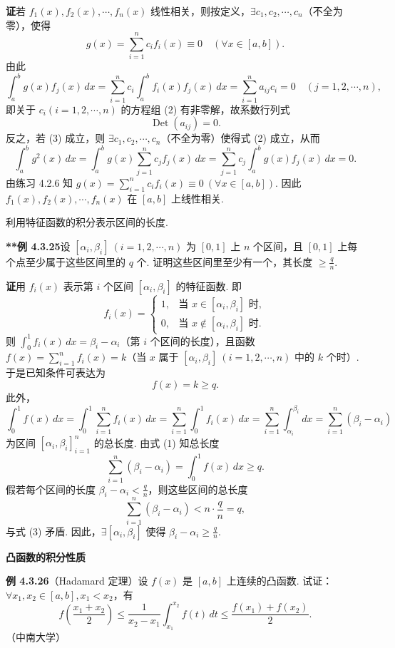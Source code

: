\documentclass[UTF8, 12pt, fontset=fandol, oneside]{ctexart}
\begin{document}
\noindent\textbf{证}\quad 若 $f_1(x),f_2(x),\cdots,f_n(x)$ 线性相关，则按定义，$\exists c_1,c_2,\cdots,c_n$（不全为零），使得
\[
g(x)=\sum_{i=1}^n c_i f_i(x)\equiv0\quad(\forall x\in[a,b]).
\tag{1}
\]
由此
\[
\int_a^b g(x)f_j(x)\,dx
=\sum_{i=1}^n c_i\int_a^b f_i(x)f_j(x)\,dx
=\sum_{i=1}^n a_{ij}c_i=0\quad(j=1,2,\cdots,n),
\tag{2}
\]
即关于 $c_i(i=1,2,\cdots,n)$ 的方程组 (2) 有非零解，故系数行列式
\[
\operatorname{Det}(a_{ij})=0.
\tag{3}
\]
反之，若 (3) 成立，则 $\exists c_1,c_2,\cdots,c_n$（不全为零）使得式 (2) 成立，从而
\[
\int_a^b g^2(x)\,dx
=\int_a^b g(x)\sum_{j=1}^n c_j f_j(x)\,dx
=\sum_{j=1}^n c_j\int_a^b g(x)f_j(x)\,dx=0.
\]
由练习 4.2.6 知 $g(x)=\sum_{i=1}^n c_i f_i(x)\equiv0\ (\forall x\in[a,b])$. 因此 $f_1(x),f_2(x),\cdots,f_n(x)$ 在 $[a,b]$ 上线性相关.

\noindent 利用特征函数的积分表示区间的长度.

\noindent\textbf{**例 4.3.25}\quad 设 $[\alpha_i,\beta_i]\ (i=1,2,\cdots,n)$ 为 $[0,1]$ 上 $n$ 个区间，且 $[0,1]$ 上每个点至少属于这些区间里的 $q$ 个. 证明这些区间里至少有一个，其长度 $\ge\frac{q}{n}$.

\noindent\textbf{证}\quad 用 $f_i(x)$ 表示第 $i$ 个区间 $[\alpha_i,\beta_i]$ 的特征函数. 即
\[
f_i(x)=
\begin{cases}
1, & \text{当 }x\in[\alpha_i,\beta_i]\text{ 时},\\
0, & \text{当 }x\notin[\alpha_i,\beta_i]\text{ 时}.
\end{cases}
\]
则 $\int_0^1 f_i(x)\,dx=\beta_i-\alpha_i$（第 $i$ 个区间的长度），且函数 $f(x)=\sum_{i=1}^n f_i(x)=k$（当 $x$ 属于 $[\alpha_i,\beta_i]\ (i=1,2,\cdots,n)$ 中的 $k$ 个时）. 于是已知条件可表达为
\[
f(x)=k\ge q.
\tag{1}
\]
此外，
\[
\int_0^1 f(x)\,dx
=\int_0^1\sum_{i=1}^n f_i(x)\,dx
=\sum_{i=1}^n\int_0^1 f_i(x)\,dx
=\sum_{i=1}^n\int_{\alpha_i}^{\beta_i}dx
=\sum_{i=1}^n(\beta_i-\alpha_i)
\tag{2}
\]
为区间 $[\alpha_i,\beta_i]_{i=1}^n$ 的总长度. 由式 (1) 知总长度
\[
\sum_{i=1}^n(\beta_i-\alpha_i)=\int_0^1 f(x)\,dx\ge q.
\tag{3}
\]
假若每个区间的长度 $\beta_i-\alpha_i<\frac{q}{n}$，则这些区间的总长度
\[
\sum_{i=1}^n(\beta_i-\alpha_i)<n\cdot\frac{q}{n}=q,
\]
与式 (3) 矛盾. 因此，$\exists[\alpha_i,\beta_i]$ 使得 $\beta_i-\alpha_i\ge\frac{q}{n}$.

\noindent\textbf{凸函数的积分性质}

\noindent\textbf{例 4.3.26}\quad （Hadamard 定理）设 $f(x)$ 是 $[a,b]$ 上连续的凸函数. 试证：$\forall x_1,x_2\in[a,b],x_1<x_2$，有
\[
f\left(\frac{x_1+x_2}{2}\right)
\le\frac1{x_2-x_1}\int_{x_1}^{x_2}f(t)\,dt
\le\frac{f(x_1)+f(x_2)}2.
\]
（中南大学）
\end{document}
